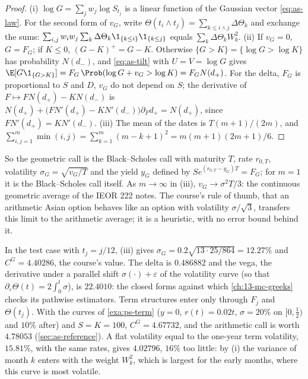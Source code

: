 \begin{proof}
(i) $\log G=\sum_jw_j\log S_{t_j}$ is a linear function of the Gaussian vector
\eqref{eq:as-law}. For the second form of $v_G$, write
$\Theta(t_i\wedge t_j)=\sum_{k\le i\wedge j}\Delta\Theta_k$ and exchange the sums:
$\sum_{i,j}w_iw_j\sum_k\Delta\Theta_k\1_{\{k\le i\}}\1_{\{k\le j\}}$ equals
$\sum_k\Delta\Theta_kW_k^2$.
(ii) If $v_G=0$, $G=F_G$; if $K\le0$, $(G-K)^+=G-K$. Otherwise $\{G>K\}=\{\log G>\log K\}$
has probability $N(d_-)$, and \eqref{eq:as-tilt} with $U=V=\log G$ gives
$\E[G\1_{\{G>K\}}]=F_G\,\Prob(\log G+v_G>\log K)=F_GN(d_+)$. For the delta, $F_G$ is
proportional to $S$ and $D$, $v_G$ do not depend on $S$; the derivative of
$F\mapsto FN(d_+)-KN(d_-)$ is $N(d_+)+\big(FN'(d_+)-KN'(d_-)\big)\partial_Fd_+=N(d_+)$, since
$FN'(d_+)=KN'(d_-)$. (iii) The mean of the dates is $T(m+1)/(2m)$, and
$\sum_{i,j=1}^m\min(i,j)=\sum_{k=1}^m(m-k+1)^2=m(m+1)(2m+1)/6$.
\end{proof}

So the geometric call is the Black--Scholes call with maturity $T$, rate $r_{0,T}$,
volatility $\sigma_G=\sqrt{v_G/T}$ and the yield $y_G$ defined by
$Se^{(r_{0,T}-y_G)T}=F_G$; for $m=1$ it is the Black--Scholes call itself. As $m\to\infty$
in (iii), $v_G\to\sigma^2T/3$: the continuous geometric average of the IEOR 222 notes. The
course's rule of thumb, that an arithmetic Asian option behaves like an option with
volatility $\sigma/\sqrt3$, transfers this limit to the arithmetic average; it is a heuristic,
with no error bound behind it.

\begin{example}\label{exa:as-geometric}
In the test case with $t_j=j/12$, (iii) gives $\sigma_G=0.2\sqrt{13\cdot25/864}=12.27\%$ and
$C^G=4.40286$, the course's value. The delta is $0.486882$ and the vega, the derivative under
a parallel shift $\sigma(\cdot)+\varepsilon$ of the volatility curve (so that
$\partial_\varepsilon\Theta(t)=2\int_0^t\sigma$), is $22.4010$: the closed forms against
which \cref{ch:13-mc-greeks} checks its pathwise estimators. Term structures enter only
through $F_j$ and $\Theta(t_j)$. With the curves of \cref{exa:ps-term} ($y=0$, $r(t)=0.02t$,
$\sigma=20\%$ on $[0,\frac12)$ and $10\%$ after) and $S=K=100$, $C^G=4.67732$, and the
arithmetic call is worth $4.78053$ (\cref{sec:as-reference}). A flat volatility equal to the
one-year term volatility, $15.81\%$, with the same rates, gives $4.02796$, $16\%$ too little:
by (i) the variance of month $k$ enters with the weight $W_k^2$, which is largest for the early
months, where this curve is most volatile.
\end{example}


